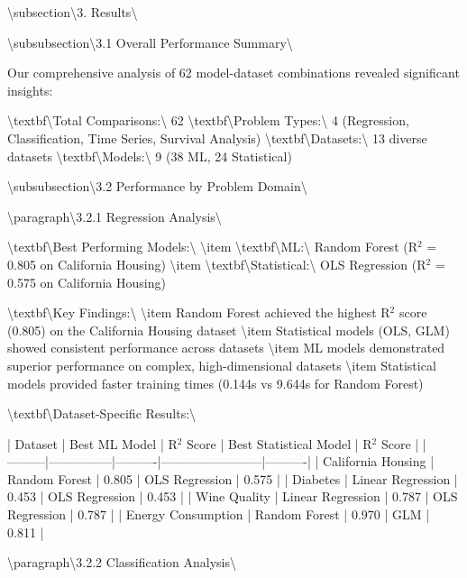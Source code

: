 \documentclass[11pt,a4paper]{article}
\begin{document}
\textbackslash{}subsection\textbackslash{}{3. Results\textbackslash{}}

\textbackslash{}subsubsection\textbackslash{}{3.1 Overall Performance Summary\textbackslash{}}

Our comprehensive analysis of 62 model-dataset combinations revealed significant insights:

\textbackslash{}textbf\textbackslash{}{Total Comparisons:\textbackslash{}} 62
\textbackslash{}textbf\textbackslash{}{Problem Types:\textbackslash{}} 4 (Regression, Classification, Time Series, Survival Analysis)
\textbackslash{}textbf\textbackslash{}{Datasets:\textbackslash{}} 13 diverse datasets
\textbackslash{}textbf\textbackslash{}{Models:\textbackslash{}} 9 (38 ML, 24 Statistical)

\textbackslash{}subsubsection\textbackslash{}{3.2 Performance by Problem Domain\textbackslash{}}

\textbackslash{}paragraph\textbackslash{}{3.2.1 Regression Analysis\textbackslash{}}

\textbackslash{}textbf\textbackslash{}{Best Performing Models:\textbackslash{}}
\textbackslash{}item \textbackslash{}textbf\textbackslash{}{ML:\textbackslash{}} Random Forest (R$^2$ = 0.805 on California Housing)
\textbackslash{}item \textbackslash{}textbf\textbackslash{}{Statistical:\textbackslash{}} OLS Regression (R$^2$ = 0.575 on California Housing)

\textbackslash{}textbf\textbackslash{}{Key Findings:\textbackslash{}}
\textbackslash{}item Random Forest achieved the highest R$^2$ score (0.805) on the California Housing dataset
\textbackslash{}item Statistical models (OLS, GLM) showed consistent performance across datasets
\textbackslash{}item ML models demonstrated superior performance on complex, high-dimensional datasets
\textbackslash{}item Statistical models provided faster training times (0.144s vs 9.644s for Random Forest)

\textbackslash{}textbf\textbackslash{}{Dataset-Specific Results:\textbackslash{}}

| Dataset | Best ML Model | R$^2$ Score | Best Statistical Model | R$^2$ Score |
|---------|---------------|----------|------------------------|----------|
| California Housing | Random Forest | 0.805 | OLS Regression | 0.575 |
| Diabetes | Linear Regression | 0.453 | OLS Regression | 0.453 |
| Wine Quality | Linear Regression | 0.787 | OLS Regression | 0.787 |
| Energy Consumption | Random Forest | 0.970 | GLM | 0.811 |

\textbackslash{}paragraph\textbackslash{}{3.2.2 Classification Analysis\textbackslash{}}
\end{document}
